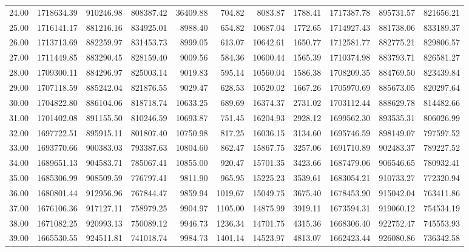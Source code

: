 \begin{table}[ht]
\begin{tabular}{rrrrrrrrrrr}
  24.00 & 1718634.39 & 910246.98 & 808387.42 & 36409.88 & 704.82 & 8083.87 & 1788.41 & 1717387.78 & 895731.57 & 821656.21 \\ 
  25.00 & 1716141.17 & 881216.16 & 834925.01 & 8988.40 & 654.82 & 10687.04 & 1772.65 & 1714927.43 & 881738.06 & 833189.37 \\ 
  26.00 & 1713713.69 & 882259.97 & 831453.73 & 8999.05 & 613.07 & 10642.61 & 1650.77 & 1712581.77 & 882775.21 & 829806.57 \\ 
  27.00 & 1711449.85 & 883290.45 & 828159.40 & 9009.56 & 584.36 & 10600.44 & 1565.39 & 1710374.98 & 883793.71 & 826581.27 \\ 
  28.00 & 1709300.11 & 884296.97 & 825003.14 & 9019.83 & 595.14 & 10560.04 & 1586.38 & 1708209.35 & 884769.50 & 823439.84 \\ 
  29.00 & 1707118.59 & 885242.04 & 821876.55 & 9029.47 & 628.53 & 10520.02 & 1667.26 & 1705970.69 & 885673.05 & 820297.64 \\ 
  30.00 & 1704822.80 & 886104.06 & 818718.74 & 10633.25 & 689.69 & 16374.37 & 2731.02 & 1703112.44 & 888629.78 & 814482.66 \\ 
  31.00 & 1701402.08 & 891155.50 & 810246.59 & 10693.87 & 751.45 & 16204.93 & 2928.12 & 1699562.30 & 893535.31 & 806026.99 \\ 
  32.00 & 1697722.51 & 895915.11 & 801807.40 & 10750.98 & 817.25 & 16036.15 & 3134.60 & 1695746.59 & 898149.07 & 797597.52 \\ 
  33.00 & 1693770.66 & 900383.03 & 793387.63 & 10804.60 & 862.47 & 15867.75 & 3257.06 & 1691710.89 & 902483.37 & 789227.52 \\ 
  34.00 & 1689651.13 & 904583.71 & 785067.41 & 10855.00 & 920.47 & 15701.35 & 3423.66 & 1687479.06 & 906546.65 & 780932.41 \\ 
  35.00 & 1685306.99 & 908509.59 & 776797.41 & 9811.90 & 965.95 & 15225.23 & 3539.61 & 1683054.21 & 910733.27 & 772320.94 \\ 
  36.00 & 1680801.44 & 912956.96 & 767844.47 & 9859.94 & 1019.67 & 15049.75 & 3675.40 & 1678453.90 & 915042.04 & 763411.86 \\ 
  37.00 & 1676106.36 & 917127.11 & 758979.25 & 9904.97 & 1105.00 & 14875.99 & 3919.11 & 1673594.31 & 919060.12 & 754534.19 \\ 
  38.00 & 1671082.25 & 920993.13 & 750089.12 & 9946.73 & 1236.34 & 14701.75 & 4315.36 & 1668306.40 & 922752.47 & 745553.93 \\ 
  39.00 & 1665530.55 & 924511.81 & 741018.74 & 9984.73 & 1401.14 & 14523.97 & 4813.07 & 1662423.44 & 926080.86 & 736342.58 \\ 

\end{tabular}
\end{table}
